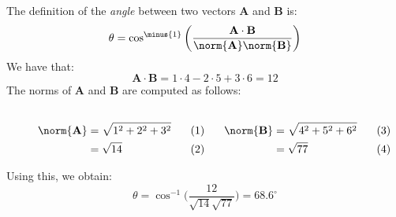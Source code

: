             \begin{solution}
                The definition of the \textit{angle} between two
                vectors $\mathbf{A}$ and $\mathbf{B}$ is:
                \begin{equation}
                    \theta=\cos^{\minus{1}}\bigg(
                        \frac{\mathbf{A}\cdot\mathbf{B}}
                        {\norm{\mathbf{A}}\norm{\mathbf{B}}}
                    \bigg)
                \end{equation}
                We have that:
                \begin{equation}
                    \mathbf{A}\cdot\mathbf{B}
                    =1\cdot{4}-2\cdot{5}+3\cdot{6}
                    =12
                \end{equation}
                The norms of $\mathbf{A}$ and $\mathbf{B}$ are
                computed as follows:
                \par
                \begin{subequations}
                    \begin{minipage}{0.49\textwidth}
                        \centering
                        \begin{align}
                            \norm{\mathbf{A}}
                            &=\sqrt{1^{2}+2^{2}+3^{2}}\\
                            &=\sqrt{14}
                        \end{align}
                    \end{minipage}
                    \hfill
                    \begin{minipage}{0.49\textwidth}
                        \centering
                        \begin{align}
                            \norm{\mathbf{B}}
                            &=\sqrt{4^{2}+5^{2}+6^{2}}\\
                            &=\sqrt{77}
                        \end{align}
                    \end{minipage}
                \end{subequations}
                \par\hfill\par
                Using this, we obtain:
                \begin{equation}
                    \theta=\cos^{-1}
                        \bigg(\frac{12}{\sqrt{14}{\sqrt{77}}}\bigg)
                    =68.6^{\circ}

\end{equation}
\end{solution}
